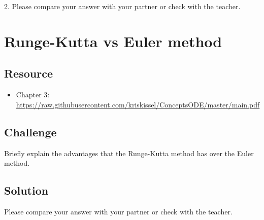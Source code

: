 2. Please compare your answer with your partner or check with the teacher.



\newpage
\section{Runge-Kutta vs Euler method}

\subsection*{Resource}
\begin{itemize}
    \item Chapter 3: \url{https://raw.githubusercontent.com/kriskissel/ConceptsODE/master/main.pdf}
\end{itemize}

\subsection*{Challenge}
Briefly explain the advantages that the Runge-Kutta method has over the Euler method.

\subsection*{Solution}
Please compare your answer with your partner or check with the teacher.
